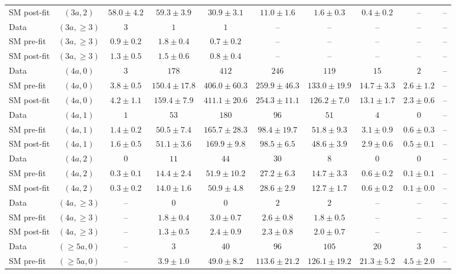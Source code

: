 \begin{table*}[h!]
{\begin{tabular}{lccccccccc}
 SM post-fit & $(3a,2)$ & $58.0\pm4.2$ & $59.3\pm3.9$ & $30.9\pm3.1$ & $11.0\pm1.6$ & $1.6\pm0.3$ & $0.4\pm0.2$ & -- & -- \\[0.5ex]
 Data & $(3a,\geq 3)$ & $3$ & $1$ & $1$ & -- & -- & -- & -- & -- \\[0.5ex]
 SM pre-fit & $(3a,\geq 3)$ & $0.9\pm0.2$ & $1.8\pm0.4$ & $0.7\pm0.2$ & -- & -- & -- & -- & -- \\[0.5ex]
 SM post-fit & $(3a,\geq 3)$ & $1.3\pm0.5$ & $1.5\pm0.6$ & $0.8\pm0.4$ & -- & -- & -- & -- & -- \\[0.5ex]
 Data & $(4a,0)$ & $3$ & $178$ & $412$ & $246$ & $119$ & $15$ & $2$ & -- \\[0.5ex]
 SM pre-fit & $(4a,0)$ & $3.8\pm0.5$ & $150.4\pm17.8$ & $406.0\pm60.3$ & $259.9\pm46.3$ & $133.0\pm19.9$ & $14.7\pm3.3$ & $2.6\pm1.2$ & -- \\[0.5ex]
 SM post-fit & $(4a,0)$ & $4.2\pm1.1$ & $159.4\pm7.9$ & $411.1\pm20.6$ & $254.3\pm11.1$ & $126.2\pm7.0$ & $13.1\pm1.7$ & $2.3\pm0.6$ & -- \\[0.5ex]
 Data & $(4a,1)$ & $1$ & $53$ & $180$ & $96$ & $51$ & $4$ & $0$ & -- \\[0.5ex]
 SM pre-fit & $(4a,1)$ & $1.4\pm0.2$ & $50.5\pm7.4$ & $165.7\pm28.3$ & $98.4\pm19.7$ & $51.8\pm9.3$ & $3.1\pm0.9$ & $0.6\pm0.3$ & -- \\[0.5ex]
 SM post-fit & $(4a,1)$ & $1.6\pm0.5$ & $51.1\pm3.6$ & $169.9\pm9.8$ & $98.5\pm6.5$ & $48.6\pm3.9$ & $2.9\pm0.6$ & $0.5\pm0.1$ & -- \\[0.5ex]
 Data & $(4a,2)$ & $0$ & $11$ & $44$ & $30$ & $8$ & $0$ & $0$ & -- \\[0.5ex]
 SM pre-fit & $(4a,2)$ & $0.3\pm0.1$ & $14.4\pm2.4$ & $51.9\pm10.2$ & $27.2\pm6.3$ & $14.7\pm3.3$ & $0.6\pm0.2$ & $0.1\pm0.1$ & -- \\[0.5ex]
 SM post-fit & $(4a,2)$ & $0.3\pm0.2$ & $14.0\pm1.6$ & $50.9\pm4.8$ & $28.6\pm2.9$ & $12.7\pm1.7$ & $0.6\pm0.2$ & $0.1\pm0.0$ & -- \\[0.5ex]
 Data & $(4a,\geq 3)$ & -- & $0$ & $0$ & $2$ & $2$ & -- & -- & -- \\[0.5ex]
 SM pre-fit & $(4a,\geq 3)$ & -- & $1.8\pm0.4$ & $3.0\pm0.7$ & $2.6\pm0.8$ & $1.8\pm0.5$ & -- & -- & -- \\[0.5ex]
 SM post-fit & $(4a,\geq 3)$ & -- & $1.3\pm0.5$ & $2.4\pm0.9$ & $2.3\pm0.8$ & $2.0\pm0.7$ & -- & -- & -- \\[0.5ex]
 Data & $(\geq 5a,0)$ & -- & $3$ & $40$ & $96$ & $105$ & $20$ & $3$ & -- \\[0.5ex]
 SM pre-fit & $(\geq 5a,0)$ & -- & $3.9\pm1.0$ & $49.0\pm8.2$ & $113.6\pm21.2$ & $126.1\pm19.2$ & $21.3\pm5.2$ & $4.5\pm2.0$ & -- \\[0.5ex]

\end{tabular}}
\end{table*}
